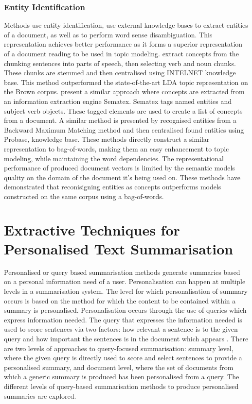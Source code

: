 \subsubsection{Entity Identification}
Methods use entity identification, use external knowledge bases to extract entities of a document, as well as to perform word sense disambiguation. This representation achieves better performance as it forms a superior representation of a document reading to be used in topic modeling. \citet{rajagopal2013commonsense} extract concepts from the chunking sentences into parts of speech, then selecting verb and noun chunks. These chunks are stemmed and then centralised using INTELNET knowledge base. This method outperformed the state-of-the-art LDA topic representation on the Brown corpus. \citet{li2016cross} present a similar approach where concepts are extracted from an information extraction engine Sematex. Sematex tags named entities and subject verb objects. These tagged elements are used to create a list of concepts from a document. A similar method is presented by \citet{wang2014concept} recognised entities from a Backward Maximum Matching method and then centralised found entities using Probase, knowledge base. These methods directly construct a similar representation to bag-of-words, making them an easy enhancement to topic modeling, while maintaining the word dependencies. The representational performance of produced document vectors is limited by the semantic models quality on the domain of the document it's being used on. These methods have demonstrated that reconisigning entities as concepts outperforms models constructed on the same corpus using a bag-of-words.

\section{Extractive Techniques for Personalised Text Summarisation}
\label{sec:2.4}
Personalised or query based summarisation methods generate summaries based on a personal information need of a user. Personalisation can happen at multiple levels in a summarisation system. The level for which personalisation of summary occurs is based on the method for which the content to be contained within a summary is personalised. Personalisation occurs through the use of queries which express information needed. The query that expresses the information needed is used to score sentences via two factors: how relevant a sentence is to the given query and how important the sentences is in the document which appears \citep{nenkova2012survey}. There are two levels of approaches to query-focused summarisation: summary level, where the given query is directly used to score and select sentences to provide a personalised summary, and document level, where the set of documents from which a generic summary is produced has been personalised from a query. The different levels of query-based summarisation methods to produce personalised summaries are explored.


